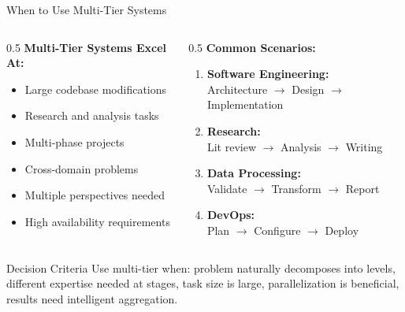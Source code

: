 \documentclass[aspectratio=169,11pt]{beamer}
\begin{document}
\begin{frame}{When to Use Multi-Tier Systems}
    \begin{columns}[T]
        \begin{column}{0.5\textwidth}
            \textbf{Multi-Tier Systems Excel At:}
            \begin{itemize}
                \item[\checkmark] Large codebase modifications
                \item[\checkmark] Research and analysis tasks
                \item[\checkmark] Multi-phase projects
                \item[\checkmark] Cross-domain problems
                \item[\checkmark] Multiple perspectives needed
                \item[\checkmark] High availability requirements
            \end{itemize}
        \end{column}
        \begin{column}{0.5\textwidth}
            \textbf{Common Scenarios:}
            \begin{enumerate}
                \item \textbf{Software Engineering:}\\Architecture $\rightarrow$ Design $\rightarrow$ Implementation
                \item \textbf{Research:}\\Lit review $\rightarrow$ Analysis $\rightarrow$ Writing
                \item \textbf{Data Processing:}\\Validate $\rightarrow$ Transform $\rightarrow$ Report
                \item \textbf{DevOps:}\\Plan $\rightarrow$ Configure $\rightarrow$ Deploy
            \end{enumerate}
        \end{column}
    \end{columns}

    \vspace{0.3cm}
    \begin{block}{Decision Criteria}
        Use multi-tier when: problem naturally decomposes into levels, different expertise needed at stages, task size is large, parallelization is beneficial, results need intelligent aggregation.
    \end{block}
\end{frame}
\end{document}
